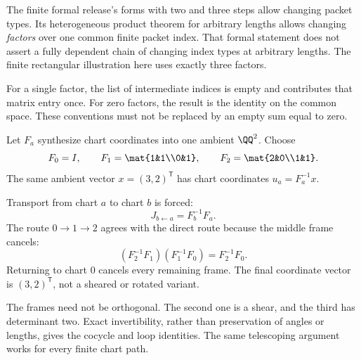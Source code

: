 The finite formal release's forms with two and three steps allow changing packet types. Its heterogeneous product theorem for arbitrary lengths allows changing \emph{factors} over one common finite packet index. That formal statement does not assert a fully dependent chain of changing index types at arbitrary lengths. The finite rectangular illustration here uses exactly three factors.

For a single factor, the list of intermediate indices is empty and contributes that matrix entry once. For zero factors, the result is the identity on the common space. These conventions must not be replaced by an empty sum equal to zero.


Let $F_a$ synthesize chart coordinates into one ambient $\QQ^2$. Choose
\[
F_0=I,\qquad F_1=\mat{1&1\\0&1},\qquad
F_2=\mat{2&0\\1&1}.
\]
The same ambient vector $x=(3,2)^\mathsf T$ has chart coordinates $u_a=F_a^{-1}x$.


Transport from chart $a$ to chart $b$ is forced:
\[
J_{b\leftarrow a}=F_b^{-1}F_a.
\]
The route $0\to1\to2$ agrees with the direct route because the middle frame cancels:
\[
(F_2^{-1}F_1)(F_1^{-1}F_0)=F_2^{-1}F_0.
\]
Returning to chart $0$ cancels every remaining frame. The final coordinate vector is $(3,2)^\mathsf T$, not a sheared or rotated variant.

The frames need not be orthogonal. The second one is a shear, and the third has determinant two. Exact invertibility, rather than preservation of angles or lengths, gives the cocycle and loop identities. The same telescoping argument works for every finite chart path.


